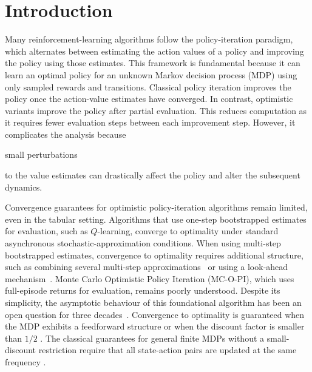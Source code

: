 
\section{Introduction}














Many reinforcement-learning algorithms follow the policy-iteration paradigm, which alternates between 
estimating the action values of a policy 
and improving the policy using those estimates. 
This framework is fundamental because it can learn an optimal policy for an unknown Markov decision process (MDP) using only sampled rewards and transitions.
Classical policy iteration improves the policy once the action-value estimates have converged.
In contrast, optimistic variants improve the policy after partial evaluation.
This reduces computation as it requires fewer evaluation steps between each improvement step.
However, it complicates the analysis because 

small perturbations 

to the value estimates
can drastically affect the policy and alter the subsequent dynamics.


















Convergence guarantees for optimistic policy-iteration algorithms remain limited, even in the tabular setting.
Algorithms that use one-step bootstrapped estimates for evaluation, such as $Q$-learning, converge to optimality under standard asynchronous stochastic-approximation conditions.
When using multi-step bootstrapped estimates, convergence to optimality requires additional structure, such as combining several multi-step approximations~\citep{Harutyunyan2016QCorrections, Munos2016SafeLearning} or using a look-ahead mechanism~\citep{Winnicki2023OnEvaluation}.
Monte Carlo Optimistic Policy Iteration (MC-O-PI), which uses full-episode returns for evaluation, remains poorly understood. Despite its simplicity, the asymptotic behaviour of this foundational algorithm has been an open question for three decades~\citep{Sutton1999OpenLearning}.
Convergence to optimality is guaranteed when the MDP exhibits a feedforward structure \citep{Wang2022OnLearning, Lubars2021OptimisticStructure}
or when the discount factor is smaller than $1/2$ \citep{Delattre2025MarkovAlgorithm}.
The classical guarantees for general finite MDPs without a small-discount restriction require that all state-action pairs are updated at the same frequency \citep{Tsitsiklis2002OnIteration, Chen2018OnProblem, Liu2021OnStarts}.














